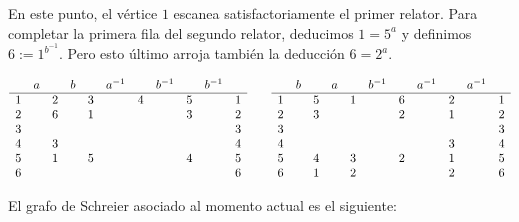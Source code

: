 En este punto, el vértice $1$ escanea satisfactoriamente el primer  relator. Para completar la primera fila del segundo relator, deducimos $1=5^a$ y definimos $6:=1^{b^{-1}}$. Pero esto último arroja también la deducción $6=2^a$. 

\begin{align*}
    \begin{array}{lllllllllll}
    & a && b && a^{-1} && b^{-1} && b^{-1}\\
    \hline
    1 && 2 &&  3 && 4   && 5 && 1 \\
    2 && 6 && 1  &&   && 3 && 2\\
    3 &&  &&    &&  &&  && 3\\
    4 && 3 &&    &&  &&   && 4\\
    5 && 1  &&  5   &&   && 4 && 5 \\
    6 &&   &&     &&    &&   && 6
    \end{array}
    \hspace{0.7cm}
    \begin{array}{lllllllllll}
    & b && a && b^{-1} && a^{-1} && a^{-1}\\
    \hline
    1 && 5 &&  1 && 6   && 2 && 1 \\
    2 && 3  &&   && 2 && 1 && 2\\
    3 &&  &&    &&  &&  && 3\\
    4 &&  &&    &&  && 3 && 4\\
    5 && 4 &&  3  && 2 && 1 && 5 \\
    6 && 1 &&  2  &&    && 2 && 6
    \end{array}
\end{align*}

El grafo de Schreier asociado al momento actual es el siguiente: 

